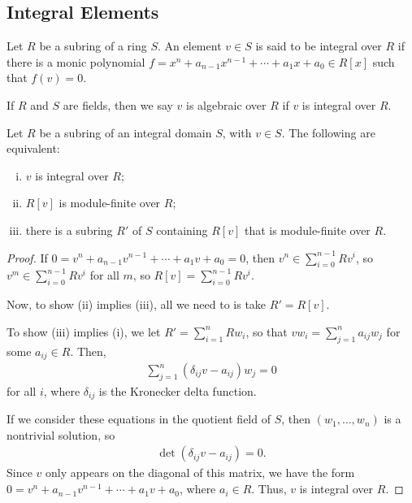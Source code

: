 \documentclass[10pt]{mypackage}
\begin{document}
\subsection{Integral Elements}%
\begin{definition}
  Let $R$ be a subring of a ring $S$. An element $v\in S$ is said to be integral over $R$ if there is a monic polynomial $f = x^n + a_{n-1}x^{n-1} + \cdots + a_{1}x + a_0\in R\left[ x \right]$ such that $f(v) = 0$.\newline

  If $R$ and $S$ are fields, then we say $v$ is algebraic over $R$ if $v$ is integral over $R$.
\end{definition}
\begin{proposition}
  Let $R$ be a subring of an integral domain $S$, with $v\in S$. The following are equivalent:
  \begin{enumerate}[(i)]
    \item $v$ is integral over $R$;
    \item $R\left[ v \right]$ is module-finite over $R$;
    \item there is a subring $R'$ of $S$ containing $R\left[ v \right]$ that is module-finite over $R$.
  \end{enumerate}
\end{proposition}
\begin{proof}
  If $0 = v^n + a_{n-1}v^{n-1} + \cdots + a_{1}v + a_0 = 0$, then $v^n\in \sum_{i=0}^{n-1}Rv^i$, so $v^{m}\in \sum_{i=0}^{n-1}Rv^i$ for all $m$, so $R\left[ v \right] = \sum_{i=0}^{n-1}Rv^i$.\newline

  Now, to show (ii) implies (iii), all we need to is take $R' = R\left[ v \right]$.\newline

  To show (iii) implies (i), we let $R' = \sum_{i=1}^{n}Rw_i$, so that $vw_i = \sum_{j=1}^{n}a_{ij}w_j$ for some $a_{ij}\in R$. Then,
  \begin{align*}
    \sum_{j=1}^{n} \left( \delta_{ij}v - a_{ij} \right)w_j = 0
  \end{align*}
  for all $i$, where $\delta_{ij}$ is the Kronecker delta function.\newline

  If we consider these equations in the quotient field of $S$, then $\left( w_1,\dots,w_n \right)$ is a nontrivial solution, so
  \begin{align*}
    \det\left( \delta_{ij}v - a_{ij} \right) = 0.
  \end{align*}
   Since $v$ only appears on the diagonal of this matrix, we have the form $0 = v^n + a_{n-1}v^{n-1} + \cdots + a_{1}v + a_0$, where $a_i\in R$. Thus, $v$ is integral over $R$.
\end{proof}
\end{document}

